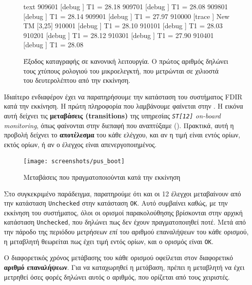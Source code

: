 \documentclass[a4paper,nobib]{tufte-book}
\begin{document}
\begin{figure}
\begin{cminted}{text}
909601  [debug  ] T1 = 28.18
909701  [debug  ] T1 = 28.08
909801  [debug  ] T1 = 28.14
909901  [debug  ] T1 = 27.97
910000  [trace  ] New TM [3,25]
910001  [debug  ] T1 = 28.10
910101  [debug  ] T1 = 28.03
910201  [debug  ] T1 = 28.12
910301  [debug  ] T1 = 27.90
910401  [debug  ] T1 = 28.08
\end{cminted}
\caption[Έξοδος καταγραφής σε κανονική λειτουργία]{Έξοδος καταγραφής σε κανονική λειτουργία. Ο πρώτος αριθμός δηλώνει τους χτύπους ρολογιού του μικροελεγκτή, που μετρώνται σε χιλιοστά του δευτερολέπτου από την εκκίνηση.}
\label{fig:lognominal}
\end{figure}

Ιδιαίτερο ενδιαφέρον έχει να παρατηρήσουμε την κατάσταση του συστήματος \acs{FDIR} κατά την εκκίνηση. Η πρώτη πληροφορία που λαμβάνουμε φαίνεται στην . Η εικόνα αυτή δείχνει τις \textbf{μεταβάσεις (transitions)} της υπηρεσίας \emph{\texttt{ST[12]} on-board monitoring}, όπως φαίνονται στην διεπαφή που αναπτύξαμε (). Πρακτικά, αυτή η προβολή δείχνει το \textbf{αποτέλεσμα} του κάθε ελέγχου, και αν η τιμή είναι εντός ορίων, εκτός ορίων, ή αν ο έλεγχος είναι απενεργοποιημένος.

\begin{figure}
	\texttt{[image: screenshots/pus\_boot]}
	\caption{Μεταβάσεις που πραγματοποιούνται κατά την εκκίνηση}
	\label{fig:pus_boot}
\end{figure}

Στο συγκεκριμένο παράδειγμα, παρατηρούμε ότι και οι 12  έλεγχοι μεταβαίνουν από την κατάσταση \texttt{Unchecked} στην κατάσταση \texttt{OK}. Αυτό συμβαίνει καθώς, με την εκκίνηση του συστήματος, όλοι οι ορισμοί παρακολούθησης βρίσκονται στην αρχική κατάσταση \texttt{Unchecked}, που δηλώνει πως δεν έχουν πραγματοποιηθεί ποτέ. Μετά από την πάροδο της περιόδου μετρήσεων \emph{επί} του αριθμού επαναλήψεων του κάθε ορισμού, η μεταβλητή θεωρείται πως έχει τιμή εντός ορίων, και ο ορισμός είναι \texttt{OK}.

Ο διαφορετικός χρόνος μετάβασης του κάθε ορισμού οφείλεται στον διαφορετικό \textbf{αριθμό επαναλήψεων}. Για να καταχωρηθεί η μετάβαση, πρέπει η μεταβλητή να έχει μετρηθεί όσες φορές δηλώνει αυτός ο αριθμός, που ορίζεται από τους χειριστές.
\end{document}
